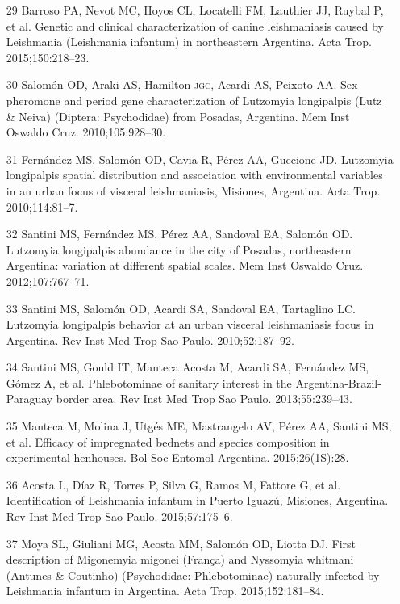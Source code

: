 \documentclass{article}
\begin{document}
\begin{itemize}
\item[29] Barroso PA, Nevot MC, Hoyos CL, Locatelli FM, Lauthier JJ, Ruybal
P, et al. Genetic and clinical characterization of canine leishmaniasis caused
by Leishmania (Leishmania infantum) in northeastern Argentina. Acta Trop.
2015;150:218–23.

\item[30] Salomón OD, Araki AS, Hamilton \textsc{jgc}, Acardi AS, Peixoto AA. Sex
pheromone and period gene characterization of Lutzomyia longipalpis (Lutz \&
Neiva) (Diptera: Psychodidae) from Posadas, Argentina. Mem Inst Oswaldo Cruz.
2010;105:928–30.

\item[31] Fernández MS, Salomón OD, Cavia R, Pérez AA, Guccione JD. Lutzomyia
longipalpis spatial distribution and association with environmental variables in
an urban focus of visceral leishmaniasis, Misiones, Argentina. Acta Trop.
2010;114:81–7.

\item[32] Santini MS, Fernández MS, Pérez AA, Sandoval EA, Salomón OD.
Lutzomyia longipalpis abundance in the city of Posadas, northeastern Argentina:
variation at different spatial scales. Mem Inst Oswaldo Cruz. 2012;107:767–71.

\item[33] Santini MS, Salomón OD, Acardi SA, Sandoval EA, Tartaglino LC.
Lutzomyia longipalpis behavior at an urban visceral leishmaniasis focus in
Argentina. Rev Inst Med Trop Sao Paulo. 2010;52:187–92.

\item[34] Santini MS, Gould IT, Manteca Acosta M, Acardi SA, Fernández MS,
Gómez A, et al. Phlebotominae of sanitary interest in the
Argentina-Brazil-Paraguay border area. Rev Inst Med Trop Sao Paulo.
2013;55:239–43.

\item[35] Manteca M, Molina J, Utgés ME, Mastrangelo AV, Pérez AA, Santini
MS, et al. Efficacy of impregnated bednets and species composition in
experimental henhouses. Bol Soc Entomol Argentina. 2015;26(1S):28.

\item[36] Acosta L, Díaz R, Torres P, Silva G, Ramos M, Fattore G, et al.
Identification of Leishmania infantum in Puerto Iguazú, Misiones, Argentina. Rev
Inst Med Trop Sao Paulo. 2015;57:175–6.

\item[37] Moya SL, Giuliani MG, Acosta MM, Salomón OD, Liotta DJ. First
description of Migonemyia migonei (França) and Nyssomyia whitmani (Antunes \&
Coutinho) (Psychodidae: Phlebotominae) naturally infected by Leishmania infantum
in Argentina. Acta Trop. 2015;152:181–84.


\end{itemize}
\end{document}
